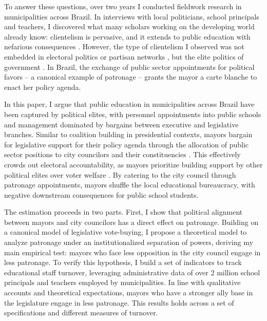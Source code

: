\documentclass[12pt,a4paper]{article}
\begin{document}
To answer these questions, over two years I conducted fieldwork research in municipalities across Brazil. In interviews with local politicians, school principals and teachers, I discovered what many scholars working on the developing world already know: clientelism is pervasive, and it extends to public education with nefarious consequences \citep{stokes_brokers_2013}. However, the type of clientelism I observed was not embedded in electoral politics \citep{oliveros_making_2016} or partisan networks \citep{akhtari_political_2015,colonnelli_patronage_2017}, but the elite politics of government \citep{raile_executive_2011}. In Brazil, the exchange of public sector appointments for political favors -- a canonical example of patronage -- grants the mayor a carte blanche to enact her policy agenda.

In this paper, I argue that public education in municipalities across Brazil have been captured by political elites, with personnel appointments into public schools and management dominated by bargains between executive and legislative branches. Similar to coalition building in presidential contexts, mayors bargain for legislative support for their policy agenda through the allocation of public sector positions to city councilors and their constituencies \citep{laver_coalitions_1990, power_optimism_2010}. This effectively crowds out electoral accountability, as mayors prioritize building support by other political elites over voter welfare \citep{ferejohn_incumbent_1986}. By catering to the city council through patronage appointments, mayors shuffle the local educational bureaucracy, with negative downstream consequences for public school students.

The estimation proceeds in two parts. First, I show that political alignment between mayors and city councilors has a direct effect on patronage. Building on a canonical model of legislative vote-buying, I propose a theoretical model to analyze patronage under an institutionalized separation of powers, deriving my main empirical test: mayors who face less opposition in the city council engage in less patronage. To verify this hypothesis, I build a set of indicators to track educational staff turnover, leveraging administrative data of over 2 million school principals and teachers employed by municipalities. In line with qualitative accounts and theoretical expectations, mayors who have a stronger ally base in the legislature engage in less patronage. This results holds across a set of specifications and different measures of turnover.
\end{document}
